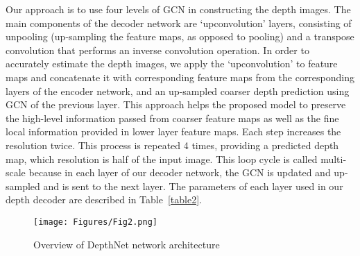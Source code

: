 \documentclass[journal]{IEEEtran}
\begin{document}
Our approach is to use four levels of GCN in constructing the depth images. The main components of the decoder network are ‘upconvolution’ layers, consisting of unpooling (up-sampling the feature maps, as opposed to pooling) and a transpose convolution that performs an inverse convolution operation. In order to accurately estimate the depth images, we apply the ‘upconvolution’ to feature maps and concatenate it with corresponding feature maps from the corresponding layers of the encoder network, and an up-sampled coarser depth prediction using GCN of the previous layer. This approach helps the proposed model to preserve the high-level information passed from coarser feature maps as well as the fine local information provided in lower layer feature maps. Each step increases the resolution twice. This process is repeated 4 times, providing a predicted depth map, which resolution is half of the input image.
This loop cycle is called multi-scale because in each layer of our decoder network, the GCN is updated and up-sampled and is sent to the next layer. The parameters of each layer used in our depth decoder are described in Table~\ref{table2}.

\begin{figure*}[t]
\centering\texttt{[image: Figures/Fig2.png]}
\captionsetup{justification=centering}
\caption{Overview of DepthNet network architecture}
\label{fig2}
\end{figure*}
\end{document}
